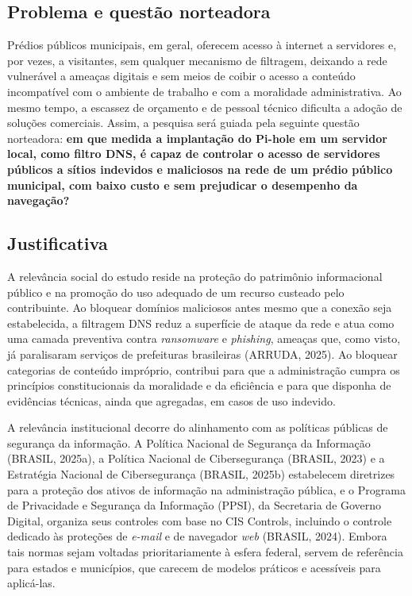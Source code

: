 \documentclass[12pt,a4paper]{article}
\begin{document}
\subsection{Problema e questão norteadora}
Prédios públicos municipais, em geral, oferecem acesso à internet a servidores e, por vezes, a visitantes, sem qualquer mecanismo de filtragem, deixando a rede vulnerável a ameaças digitais e sem meios de coibir o acesso a conteúdo incompatível com o ambiente de trabalho e com a moralidade administrativa. Ao mesmo tempo, a escassez de orçamento e de pessoal técnico dificulta a adoção de soluções comerciais. Assim, a pesquisa será guiada pela seguinte questão norteadora: \textbf{em que medida a implantação do Pi-hole em um servidor local, como filtro DNS, é capaz de controlar o acesso de servidores públicos a sítios indevidos e maliciosos na rede de um prédio público municipal, com baixo custo e sem prejudicar o desempenho da navegação?}

\subsection{Justificativa}
A relevância social do estudo reside na proteção do patrimônio informacional público e na promoção do uso adequado de um recurso custeado pelo contribuinte. Ao bloquear domínios maliciosos antes mesmo que a conexão seja estabelecida, a filtragem DNS reduz a superfície de ataque da rede e atua como uma camada preventiva contra \textit{ransomware} e \textit{phishing}, ameaças que, como visto, já paralisaram serviços de prefeituras brasileiras (ARRUDA, 2025). Ao bloquear categorias de conteúdo impróprio, contribui para que a administração cumpra os princípios constitucionais da moralidade e da eficiência e para que disponha de evidências técnicas, ainda que agregadas, em casos de uso indevido.

A relevância institucional decorre do alinhamento com as políticas públicas de segurança da informação. A Política Nacional de Segurança da Informação (BRASIL, 2025a), a Política Nacional de Cibersegurança (BRASIL, 2023) e a Estratégia Nacional de Cibersegurança (BRASIL, 2025b) estabelecem diretrizes para a proteção dos ativos de informação na administração pública, e o Programa de Privacidade e Segurança da Informação (PPSI), da Secretaria de Governo Digital, organiza seus controles com base no CIS Controls, incluindo o controle dedicado às proteções de \textit{e-mail} e de navegador \textit{web} (BRASIL, 2024). Embora tais normas sejam voltadas prioritariamente à esfera federal, servem de referência para estados e municípios, que carecem de modelos práticos e acessíveis para aplicá-las.
\end{document}
